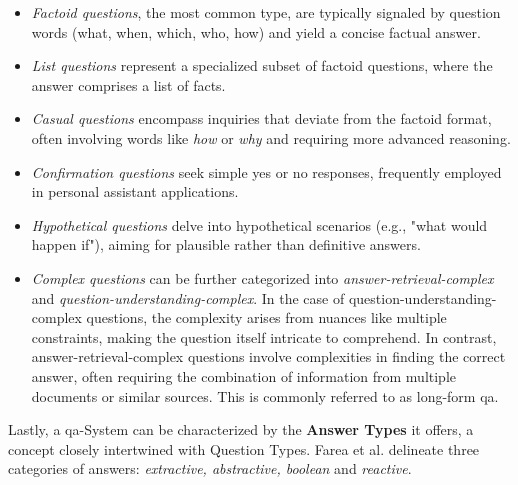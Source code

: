 \begin{itemize}
   \item \textit{Factoid questions}, the most common type, are typically signaled by question words (what, when, which, who, how) and yield a concise factual answer.
   
   \item \textit{List questions} represent a specialized subset of factoid questions, where the answer comprises a list of facts.
   
   \item \textit{Casual questions} encompass inquiries that deviate from the factoid format, often involving words like \textit{how} or \textit{why} and requiring more advanced reasoning.
   
   \item \textit{Confirmation questions} seek simple yes or no responses, frequently employed in personal assistant applications.
   
   \item \textit{Hypothetical questions} delve into hypothetical scenarios (e.g., "what would happen if"), aiming for plausible rather than definitive answers.
   
   \item \textit{Complex questions} can be further categorized into \textit{answer-retrieval-complex} and \textit{question-understanding-complex}. In the case of question-understanding-complex questions, the complexity arises from nuances like multiple constraints, making the question itself intricate to comprehend. In contrast, answer-retrieval-complex questions involve complexities in finding the correct answer, often requiring the combination of information from multiple documents or similar sources. This is commonly referred to as long-form \gls{qa}.
\end{itemize}

Lastly, a \gls{qa}-System can be characterized by the \textbf{Answer Types} it offers, a concept closely intertwined with Question Types. Farea et al. \cite{farea_evaluation_2022} delineate three categories of answers: \textit{extractive, abstractive, boolean} and \textit{reactive}. 

